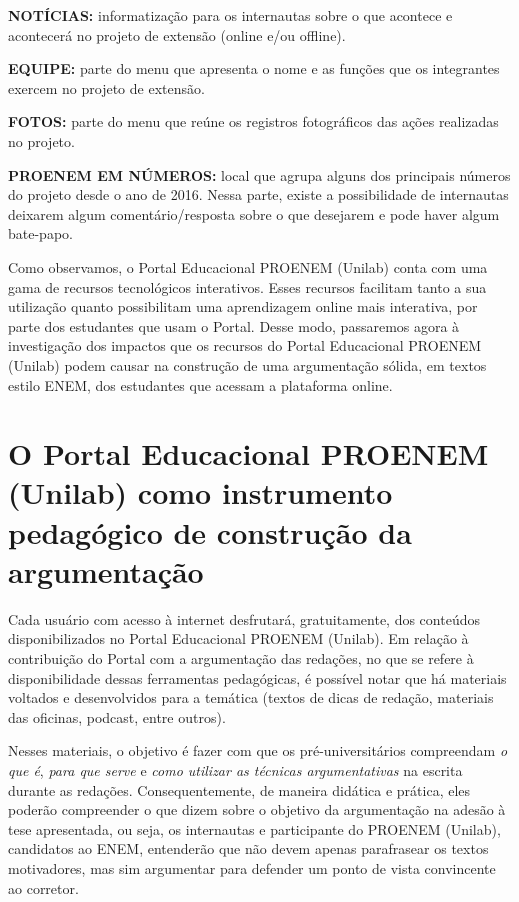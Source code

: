 \documentclass{textolivre}
\begin{document}
\textbf{NOTÍCIAS:} informatização para os internautas sobre o que acontece e acontecerá no projeto de extensão (online e/ou offline).

\textbf{EQUIPE:} parte do menu que apresenta o nome e as funções que os integrantes exercem no projeto de extensão.

\textbf{FOTOS:} parte do menu que reúne os registros fotográficos das ações realizadas no projeto.

\textbf{PROENEM EM NÚMEROS:} local que agrupa alguns dos principais números do projeto desde o ano de 2016. Nessa parte, existe a possibilidade de internautas deixarem algum comentário/resposta sobre o que desejarem e pode haver algum bate-papo.

Como observamos, o Portal Educacional PROENEM (Unilab) conta com uma gama de recursos tecnológicos interativos. Esses recursos facilitam tanto a sua utilização quanto possibilitam uma aprendizagem online mais interativa, por parte dos estudantes que usam o Portal. Desse modo, passaremos agora à investigação dos impactos que os recursos do Portal Educacional PROENEM (Unilab) podem causar na construção de uma argumentação sólida, em textos estilo ENEM, dos estudantes que acessam a plataforma online.

\section{O Portal Educacional PROENEM (Unilab) como instrumento pedagógico de construção da argumentação}
Cada usuário com acesso à internet desfrutará, gratuitamente, dos conteúdos disponibilizados no Portal Educacional PROENEM (Unilab). Em relação à contribuição do Portal com a argumentação das redações, no que se refere à disponibilidade dessas ferramentas pedagógicas, é possível notar que há materiais voltados e desenvolvidos para a temática (textos de dicas de redação, materiais das oficinas, podcast, entre outros).

Nesses materiais, o objetivo é fazer com que os pré-universitários compreendam \emph{o que é}, \emph{para que serve} e \emph{como utilizar as técnicas argumentativas} na escrita durante as redações. Consequentemente, de maneira didática e prática, eles poderão compreender o que \textcite{perelman1996} dizem sobre o objetivo da argumentação na adesão à tese apresentada, ou seja, os internautas e participante do PROENEM (Unilab), candidatos ao ENEM, entenderão que não devem apenas parafrasear os textos motivadores, mas sim argumentar para defender um ponto de vista convincente ao corretor. 
\end{document}
